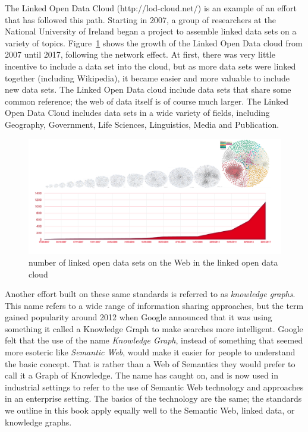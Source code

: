 The Linked Open Data Cloud (http://lod-cloud.net/) is an example of an
effort that has followed this path. Starting in 2007, a group of
researchers at the National University of Ireland began a project to
assemble linked data sets on a variety of topics. Figure~\ref{fig:ch1.1} shows the
growth of the Linked Open Data cloud from 2007 until 2017, following the
network effect. At first, there was very little incentive to include a
data set into the cloud, but as more data sets were linked together
(including Wikipedia), it became easier and more valuable to include new
data sets. The Linked Open Data cloud include data sets that share some
common reference; the web of data itself is of course much larger. The
Linked Open Data Cloud includes data sets in a wide variety of fields,
including Geography, Government, Life Sciences, Linguistics, Media and
Publication.

\begin{figure}
    \centering
    \includegraphics[width=5.0in]{media/image1.png}
    \caption{number of linked open data sets on the Web in the linked open
data cloud}
    \label{fig:ch1.1}
\end{figure}


Another effort built on these same standards is referred to as \emph{knowledge graphs}. 
This name refers to a wide range of information sharing approaches, but 
the term gained popularity around 2012 when Google announced that it was 
using something it called a Knowledge Graph to make searches more intelligent. 
Google felt that the use of the name \emph{Knowledge Graph}, instead of 
something that seemed more esoteric like \emph{Semantic Web}, 
would make it easier for people to understand the 
basic concept.  That is rather than a Web of Semantics they would prefer to 
call it a Graph of Knowledge.   The name has caught on, and is now used 
in industrial settings to refer to the use of Semantic Web technology and approaches
in an enterprise setting.  The basics of the technology are the same; the
standards we outline in this book apply equally well to the Semantic Web, linked data, or knowledge graphs.


